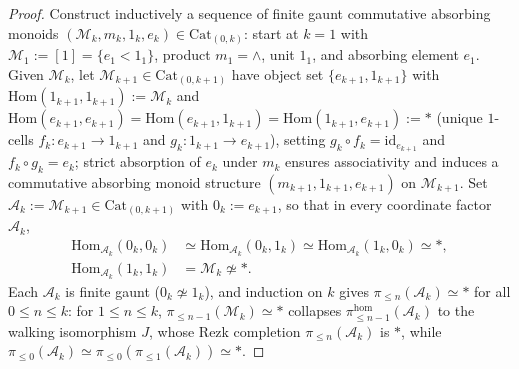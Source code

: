 \documentclass[10pt,twoside,openright]{book}
\theoremstyle{crmplain}
\theoremstyle{crmdef}
\theoremstyle{crmremark}
\begin{document}
\begin{proof}
Construct inductively a sequence of finite gaunt commutative absorbing monoids $(\mathcal{M}_k, m_k, 1_k, e_k) \in \mathrm{Cat}_{(0, k)}$: start at $k = 1$ with $\mathcal{M}_1 := [1] = \{e_1 < 1_1\}$, product $m_1 = \wedge$, unit $1_1$, and absorbing element $e_1$. Given $\mathcal{M}_k$, let $\mathcal{M}_{k+1} \in \mathrm{Cat}_{(0, k+1)}$ have object set $\{e_{k+1}, 1_{k+1}\}$ with $\mathrm{Hom}(1_{k+1}, 1_{k+1}) := \mathcal{M}_k$ and $\mathrm{Hom}(e_{k+1}, e_{k+1}) = \mathrm{Hom}(e_{k+1}, 1_{k+1}) = \mathrm{Hom}(1_{k+1}, e_{k+1}) := *$ (unique $1$-cells $f_k : e_{k+1} \to 1_{k+1}$ and $g_k : 1_{k+1} \to e_{k+1}$), setting $g_k \circ f_k = \mathrm{id}_{e_{k+1}}$ and $f_k \circ g_k = e_k$; strict absorption of $e_k$ under $m_k$ ensures associativity and induces a commutative absorbing monoid structure $(m_{k+1}, 1_{k+1}, e_{k+1})$ on $\mathcal{M}_{k+1}$. Set $\mathcal{A}_k := \mathcal{M}_{k+1} \in \mathrm{Cat}_{(0, k+1)}$ with $0_k := e_{k+1}$, so that in every coordinate factor $\mathcal{A}_k$,
\[
  \begin{aligned}
    \mathrm{Hom}_{\mathcal{A}_k}(0_k, 0_k) &\simeq \mathrm{Hom}_{\mathcal{A}_k}(0_k, 1_k) \simeq \mathrm{Hom}_{\mathcal{A}_k}(1_k, 0_k) \simeq *, \\
    \mathrm{Hom}_{\mathcal{A}_k}(1_k, 1_k) &= \mathcal{M}_k \not\simeq *.
  \end{aligned}
\]
Each $\mathcal{A}_k$ is finite gaunt ($0_k \not\simeq 1_k$), and induction on $k$ gives $\pi_{\le n}(\mathcal{A}_k) \simeq *$ for all $0 \le n \le k$: for $1 \le n \le k$, $\pi_{\le n-1}(\mathcal{M}_k) \simeq *$ collapses $\pi_{\le n-1}^{\mathrm{hom}}(\mathcal{A}_k)$ to the walking isomorphism $J$, whose Rezk completion $\pi_{\le n}(\mathcal{A}_k)$ is $*$, while $\pi_{\le 0}(\mathcal{A}_k) \simeq \pi_{\le 0}(\pi_{\le 1}(\mathcal{A}_k)) \simeq *$.


\end{proof}
\end{document}
